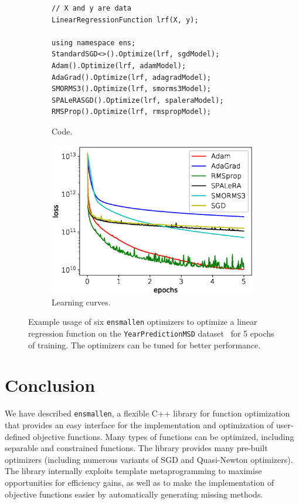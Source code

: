 \documentclass{article}
\begin{document}
\begin{figure}[b!]
\centering
\begin{subfigure}[b]{0.49\textwidth}
\begin{verbatim}
// X and y are data
LinearRegressionFunction lrf(X, y);

using namespace ens;
StandardSGD<>().Optimize(lrf, sgdModel);
Adam().Optimize(lrf, adamModel);
AdaGrad().Optimize(lrf, adagradModel);
SMORMS3().Optimize(lrf, smorms3Model);
SPALeRASGD().Optimize(lrf, spaleraModel);
RMSProp().Optimize(lrf, rmspropModel);
\end{verbatim}
\caption{Code.}
\end{subfigure}
\begin{subfigure}[b]{0.49\textwidth}
  \centering
  \includegraphics[width=\textwidth,height=0.6\textwidth]{experiments/learning_curves_crop.eps}
\caption{Learning curves.}
\end{subfigure}
\caption{Example usage of six \texttt{\small ensmallen} optimizers to optimize a
linear regression function on the \texttt{\small YearPredictionMSD}
dataset~\cite{ucimlrepository} for 5 epochs of training.  The optimizers can be
tuned for better performance.}
\label{fig:learning_curve}
\vspace*{-1ex}
\end{figure}

\vspace*{-0.3em}
\section{Conclusion}
\vspace*{-0.5em}

We have described {\tt ensmallen}, a flexible C++ library for function
optimization that provides an easy interface for the implementation and optimization
of user-defined objective functions.  Many types of functions can be optimized,
including separable and constrained functions.
The library provides many pre-built optimizers (including numerous variants
of SGD and Quasi-Newton optimizers).
The library internally exploits template metaprogramming
to maximise opportunities for efficiency gains,
as well as 
to make the implementation of objective functions easier
by automatically generating missing methods.
\end{document}
